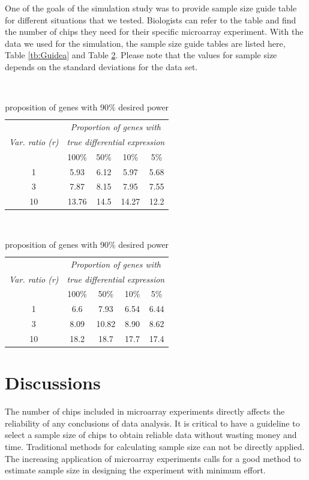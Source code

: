 \documentclass{bioinfo}
\begin{document}
One of the goals of the simulation study was to provide sample
size guide table for different situations that we tested.
Biologists can refer to the table and find the number of chips
they need for their specific microarray experiment. With the data
we used for the simulation, the sample size guide tables are
listed here, Table \ref{tb:Guidea} and Table \ref{tb:Guideb}.
Please note that the values for sample size depends on the
standard deviations for the data set.

\begin{table}\centering
  \caption{proposition of genes with 80\% desired power}\
  \begin{tabular}{c|cccc} \hline
    &\multicolumn{4}{c}{\itshape Proportion of genes with }\\
   \itshape Var. ratio (r)  &\multicolumn{4}{c}{\itshape true differential expression}\\
   \cline{2-5}
    & 100\% & 50\% & 10\% & 5\%\\
    \hline
    1 & 5.93 & 6.12 & 5.97 & 5.68\\
    3 & 7.87 & 8.15 & 7.95 & 7.55\\
    10 & 13.76 & 14.5 & 14.27 & 12.2\\
    \hline
  \end{tabular}
  \label{tb:Guidea}



  \caption{proposition of genes with 90\% desired power}\
  \begin{tabular}{c|cccc} \hline
    &\multicolumn{4}{c}{\itshape Proportion of genes with }\\
   \itshape Var. ratio (r)  &\multicolumn{4}{c}{\itshape true differential expression}\\
    \cline{2-5}
     & 100\% & 50\% & 10\% & 5\%\\
    \hline
    1 & 6.6 & 7.93 & 6.54 & 6.44\\
    3 & 8.09 & 10.82 & 8.90 & 8.62\\
    10 & 18.2 & 18.7 & 17.7 & 17.4\\
    \hline
  \end{tabular}
  \label{tb:Guideb}
\end{table}




\section{Discussions}

The number of chips included in microarray experiments directly
affects the reliability of any conclusions of data analysis. It is
critical to have a guideline to select a sample size of chips to
obtain reliable data without wasting money and time. Traditional
methods for calculating sample size can not be directly applied.
The increasing application of microarray experiments calls for a
good method to estimate sample size in designing the experiment
with minimum effort.
\end{document}
